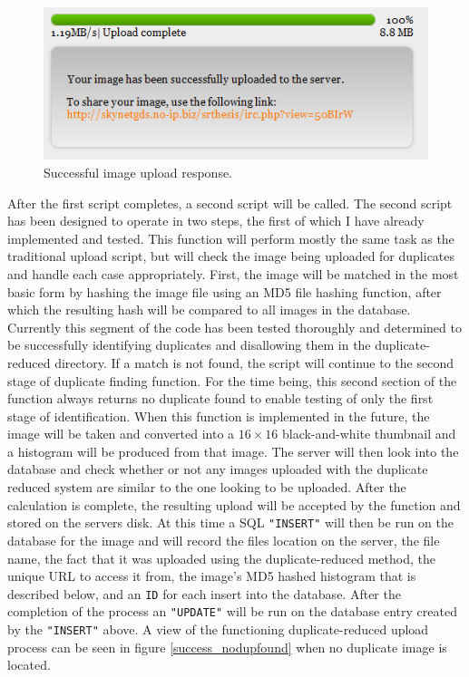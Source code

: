 \documentclass[11pt]{article}
\begin{document}
\begin{figure}[htbp]
\centering
\includegraphics[width=5in]{success_duponly}
\caption{Successful image upload response.}
\label{success_duponly}
\end{figure}

After the first script completes, a second script will be called. The second script has been designed to operate in two steps, the first of which I have already implemented and tested. This function will perform mostly the same task as the traditional upload script, but will check the image being uploaded for duplicates and handle each case appropriately. First, the image will be matched in the most basic form by hashing the image file using an MD5 file hashing function, after which the resulting hash will be compared to all images in the database. Currently this segment of the code has been tested thoroughly and determined to be successfully identifying duplicates and disallowing them in the duplicate-reduced directory. If a match is not found, the script will continue to the second stage of duplicate finding function. For the time being, this second section of the function always returns no duplicate found to enable testing of only the first stage of identification. When this function is implemented in the future, the image will be taken and converted into a $16\times 16$ black-and-white thumbnail and a histogram will be produced from that image. The server will then look into the database and check whether or not any images uploaded with the duplicate reduced system are similar to the one looking to be uploaded. After the calculation is complete, the resulting upload will be accepted by the function and stored on the servers disk. At this time a SQL {\tt "INSERT"} will then be run on the database for the image and will record the files location on the server, the file name, the fact that it was uploaded using the duplicate-reduced method, the unique URL to access it from, the image's MD5 hashed histogram that is described below, and an {\tt ID} for each insert into the database. After the completion of the process an {\tt "UPDATE"} will be run on the database entry created by the {\tt "INSERT"} above. A view of the functioning duplicate-reduced upload process can be seen in figure \ref{success_nodupfound} when no duplicate image is located.
\end{document}
